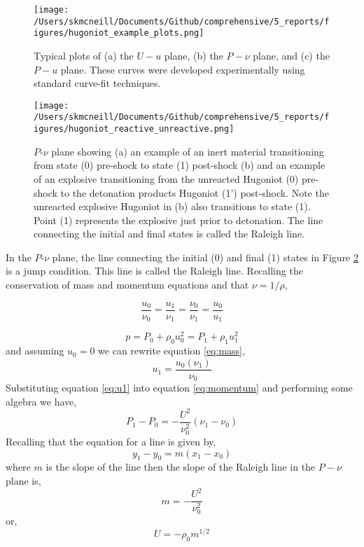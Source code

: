  \begin{figure}
  \begin{center}
   \texttt{[image: /Users/skmcneill/Documents/Github/comprehensive/5\_reports/figures/hugoniot\_example\_plots.png]}
  \end{center}
  \caption{Typical plots of (a) the $U-u$ plane, (b) the $P-\nu$ plane, and (c) the $P-u$ plane.  These curves were developed experimentally using standard curve-fit techniques.}
\label{fig:hugoniot}
\end{figure}%
  
 \begin{figure}
  \begin{center}
   \texttt{[image: /Users/skmcneill/Documents/Github/comprehensive/5\_reports/figures/hugoniot\_reactive\_unreactive.png]}
  \end{center}
  \caption{ $P\mbox{-}\nu$ plane showing (a) an example of an inert material transitioning from state (0) pre-shock to state (1) post-shock (b) and an example of an explosive transitioning from the unreacted Hugoniot (0) pre-shock to the detonation products Hugoniot (1') post-shock.  Note the unreacted explosive Hugoniot in (b) also transitions to state (1).  Point (1) represents the explosive just prior to detonation.  The line connecting the initial and final states is called the Raleigh line.}
\label{fig:hugoniot_inert_explosive}
\end{figure}%

In the $P\mbox{-}\nu$ plane, the line connecting the initial (0) and final (1) states in Figure \ref{fig:hugoniot_inert_explosive} is a jump condition.  This line is called the Raleigh line.  Recalling the conservation of mass and momentum equations and that $\nu = 1/\rho$,

\begin{equation}\label{eq:mass}
\frac{u_0}{\nu_0} = \frac{u_1}{\nu_1} = \frac{\nu_0}{\nu_1} = \frac{u_0}{u_1}
\end{equation}

\begin{equation}\label{eq:momentum}
p = P_0 + \rho_0 u_0^2 = P_1 + \rho_1 u_1^2
\end{equation}and assuming $u_0=0$ we can rewrite equation \ref{eq:mass},
\begin{equation} \label{eq:u1}
u_1=\frac{u_0(\nu_1)}{\nu_0}
\end{equation}
Substituting equation \ref{eq:u1} into equation \ref{eq:momentum} and performing some algebra we have,
\begin{equation}
P_1-P_0=-\frac{U^2}{\nu_0^2}\left(\nu_1-\nu_0\right)
\end{equation}
Recalling that the equation for a line is given by,
\begin{equation}
y_1-y_0 = m(x_1-x_0)
\end{equation}
where $m$ is the slope of the line then the slope of the Raleigh line in the $P-\nu$ plane is,
\begin{equation}
m = -\frac{U^2}{\nu_0^2}
\end{equation}
or, 
\begin{equation} \label{eq:shock_velocity}
U = -\rho_0m^{1/2}
\end{equation}

